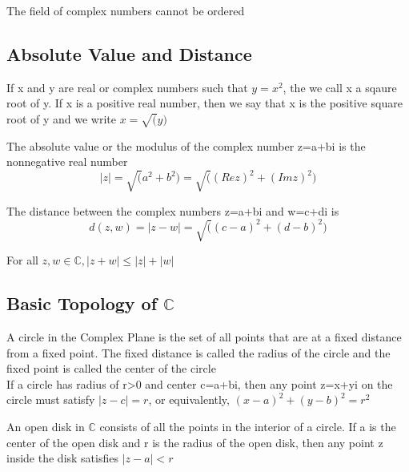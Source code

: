 \documentclass{article}
\begin{document}
\begin{theorem}
    The field of complex numbers cannot be ordered
\end{theorem}

\subsection{Absolute Value and Distance}

\begin{definition}
    If x and y are real or complex numbers such that $y=x^2$, the we call x a
    sqaure root of y. If x is a positive real number, then we say that x is the
    positive square root of y and we write $x=\sqrt(y)$
\end{definition}

\begin{definition}
    The absolute value or the modulus of the complex number z=a+bi is the nonnegative
    real number $$ |z | = \sqrt(a^2 + b^2) = \sqrt((Re z)^2 + (Im z)^2) $$
\end{definition}

\begin{definition}
    The distance between the complex numbers z=a+bi and w=c+di is
    $$ d(z,w) = |z-w| = \sqrt((c-a)^2 + (d-b)^2)$$
\end{definition}

\begin{theorem}
    For all $z,w \in \mathbb{C}, |z+w| \leq |z| + |w| $
\end{theorem}

\subsection{Basic Topology of $\mathbb{C}$}

\begin{definition}[Circle]
    A circle in the Complex Plane is the set of all points that are at a fixed
    distance from a fixed point. The fixed distance is called the radius of the
    circle and the fixed point is called the center of the circle\\

    If a circle has radius of r>0 and center c=a+bi, then any point z=x+yi on the
    circle must satisfy $|z-c| = r$, or equivalently, $(x-a)^2 + (y-b)^2 = r^2$
\end{definition}

\begin{definition}
    An open disk in $\mathbb{C}$ consists of all the points in the interior of a
    circle. If a is the center of the open disk and r is the radius of the open
    disk, then any point z inside the disk satisfies $|z-a|<r$
\end{definition}
\end{document}
